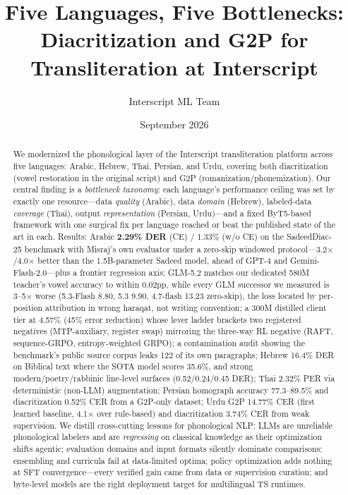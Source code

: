 \documentclass[11pt]{article}
\title{Five Languages, Five Bottlenecks:\\ Diacritization and G2P for Transliteration at Interscript}
\author{Interscript ML Team}
\date{September 2026}
\begin{document}
\maketitle

\begin{abstract}
We modernized the phonological layer of the Interscript transliteration
platform across five languages: Arabic, Hebrew, Thai, Persian, and Urdu,
covering both diacritization (vowel restoration in the original script)
and G2P (romanization/phonemization). Our central finding is a
\emph{bottleneck taxonomy}: each language's performance ceiling was set
by exactly one resource---data \emph{quality} (Arabic), data \emph{domain}
(Hebrew), labeled-data \emph{coverage} (Thai), output
\emph{representation} (Persian, Urdu)---and a fixed ByT5-based framework
with one surgical fix per language reached or beat the published
state of the art in each. Results: Arabic \textbf{2.29\% DER} (CE) /
1.33\% (w/o CE) on the SadeedDiac-25 benchmark with Misraj's own
evaluator under a zero-skip windowed protocol---3.2$\times$/4.0$\times$
better than the 1.5B-parameter Sadeed model, ahead of GPT-4 and
Gemini-Flash-2.0---plus a frontier regression axis: GLM-5.2 matches our
dedicated 580M teacher's vowel accuracy to within 0.02pp, while every
GLM successor we measured is 3--5$\times$ worse (5.3-Flash 8.80,
5.3 9.90, 4.7-flash 13.23 zero-skip), the loss located by per-position
attribution in wrong haraqat, not writing convention; a 300M distilled
client tier at 4.57\% (45\% error reduction) whose lever ladder brackets
two registered negatives (MTP-auxiliary, register swap) mirroring the
three-way RL negative (RAFT, sequence-GRPO, entropy-weighted GRPO); a
contamination audit showing the benchmark's public source corpus leaks
122 of its own paragraphs; Hebrew 16.4\% DER
on Biblical text where the SOTA model scores 35.6\%, and strong
modern/poetry/rabbinic line-level surfaces (0.52/0.24/0.45 DER);
Thai 2.32\% PER
via deterministic (non-LLM) augmentation; Persian homograph accuracy
77.3--89.5\% and diacritization 0.52\% CER from a G2P-only dataset;
Urdu G2P 14.77\% CER (first learned baseline, 4.1$\times$ over
rule-based) and diacritization 3.74\% CER from weak supervision. We
distill cross-cutting lessons for phonological NLP: LLMs are unreliable
phonological labelers and are \emph{regressing} on classical knowledge
as their optimization shifts agentic; evaluation domains and input
formats silently dominate comparisons; ensembling and curricula fail
at data-limited optima; policy optimization adds nothing at SFT
convergence---every verified gain came from data or supervision
curation; and byte-level models are the
right deployment target for multilingual TS runtimes.
\end{abstract}
\end{document}
